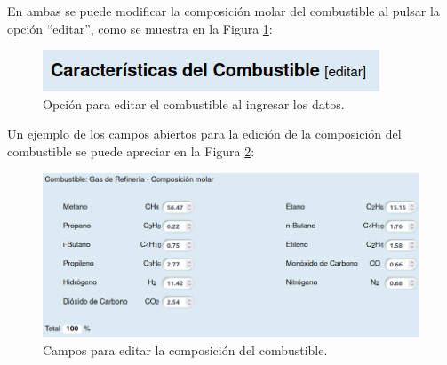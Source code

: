 \par En ambas se puede modificar la composición molar del combustible al pulsar la opción ``editar'', como se muestra en la Figura \ref{fig:edit_fuel}:
\begin{figure}[H] \begin{center} \includegraphics[scale=0.6]{images/edit_fuel}
\caption[Opción para editar el combustible]{Opción para editar el combustible al ingresar los datos.}
\label{fig:edit_fuel} \end{center} \end{figure}
\par Un ejemplo de los campos abiertos para la edición de la composición del combustible se puede apreciar en la Figura \ref{fig:edit_fuel_ext}:
\begin{figure}[hbt] \begin{center}
\includegraphics[scale=0.45]{images/edit_fuel_ext}
\caption[Campos para editar la composición del combustible]{Campos para editar la composición del combustible.}
\label{fig:edit_fuel_ext} \end{center} \end{figure}

